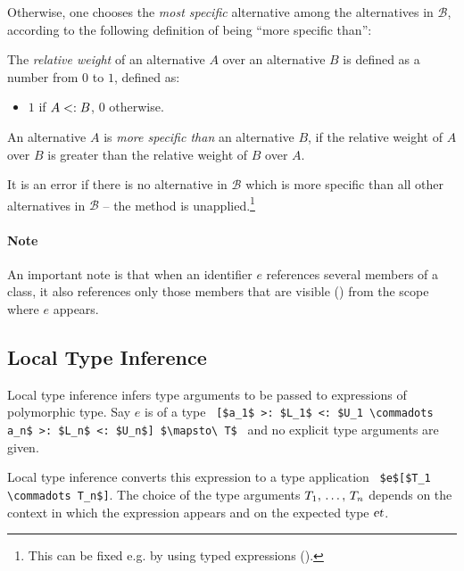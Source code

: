Otherwise, one chooses the {\em most specific} alternative among the alternatives in $\mathcal{B}$, according to the following definition of being ``more specific than'':

\begin{definition}
The {\em relative weight} of an alternative $A$ over an alternative $B$ is defined as a number from $0$ to $1$, defined as:
\begin{itemize}
\item $1$ if $A <: B$, $0$ otherwise.
\end{itemize}
\end{definition}

An alternative $A$ is {\em more specific than} an alternative $B$, if the relative weight of $A$ over $B$ is greater than the relative weight of $B$ over $A$. 

It is an error if there is no alternative in $\mathcal{B}$ which is more specific than all other alternatives in $\mathcal{B}$ -- the method is unapplied.\footnote{This can be fixed e.g. by using typed expressions ().}

\paragraph{Note}
An important note is that when an identifier $e$ references several members of a class, it also references only those members that are visible () from the scope where $e$ appears. 








\subsection{Local Type Inference}
\label{sec:local-type-inference}

Local type inference infers type arguments to be passed to expressions of polymorphic type. Say $e$ is of a type ~\lstinline![$a_1$ >: $L_1$ <: $U_1 \commadots a_n$ >: $L_n$ <: $U_n$] $\mapsto\ T$!~ and no explicit type arguments are given. 

Local type inference converts this expression to a type application ~\lstinline!$e$[$T_1 \commadots T_n$]!. The choice of the type arguments $T_1 ,\, \ldots ,\, T_n$ depends on the context in which the expression appears and on the expected type $\mbox{\sl et}$. 

